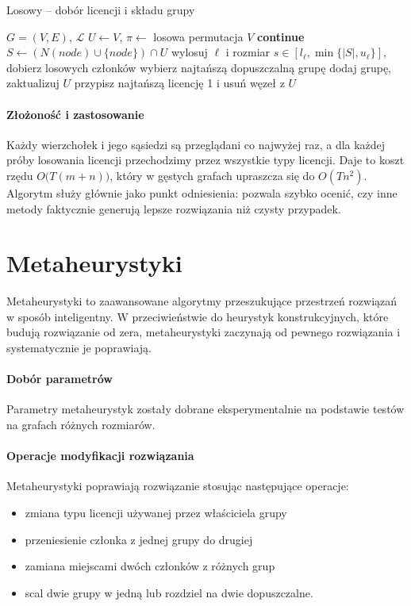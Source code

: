 \begin{algorithm}[H]
  \caption{Losowy -- dobór licencji i składu grupy}
  \label{alg:randomized}
  \begin{algorithmic}[1]
    \Require $G=(V,E)$, $\mathcal{L}$
    \State $U\gets V$, $\pi\gets$ losowa permutacja $V$
     \textbf{continue}\EndIf
    \State $S\gets(N(node)\cup\{node\})\cap U$
    \State wylosuj $\ell$ i rozmiar $s\in[l_\ell,\min\{|S|,u_\ell\}]$, dobierz losowych członków
    \Else
    \State wybierz najtańszą dopuszczalną grupę
    \EndIf
    \State dodaj grupę, zaktualizuj $U$
    \EndFor
     przypisz najtańszą licencję 1 i usuń węzeł z $U$ \EndWhile
  \end{algorithmic}
\end{algorithm}

\paragraph{Złożoność i zastosowanie}
Każdy wierzchołek i jego sąsiedzi są przeglądani co najwyżej raz, a dla każdej próby losowania licencji przechodzimy przez wszystkie typy licencji. Daje to koszt rzędu $O\bigl(T(m + n)\bigr)$, który w gęstych grafach upraszcza się do $O(T n^2)$. Algorytm służy głównie jako punkt odniesienia: pozwala szybko ocenić, czy inne metody faktycznie generują lepsze rozwiązania niż czysty przypadek.


\section{Metaheurystyki}

Metaheurystyki to zaawansowane algorytmy przeszukujące przestrzeń rozwiązań w sposób inteligentny. W przeciwieństwie do heurystyk konstrukcyjnych, które budują rozwiązanie od zera, metaheurystyki zaczynają od pewnego rozwiązania i systematycznie je poprawiają.

\paragraph{Dobór parametrów}
Parametry metaheurystyk zostały dobrane eksperymentalnie na podstawie testów na grafach różnych rozmiarów.

\paragraph{Operacje modyfikacji rozwiązania}
Metaheurystyki poprawiają rozwiązanie stosując następujące operacje:
\begin{itemize}
  \item zmiana typu licencji używanej przez właściciela grupy
  \item przeniesienie członka z jednej grupy do drugiej
  \item zamiana miejscami dwóch członków z różnych grup
  \item scal dwie grupy w jedną lub rozdziel na dwie dopuszczalne.
\end{itemize}

